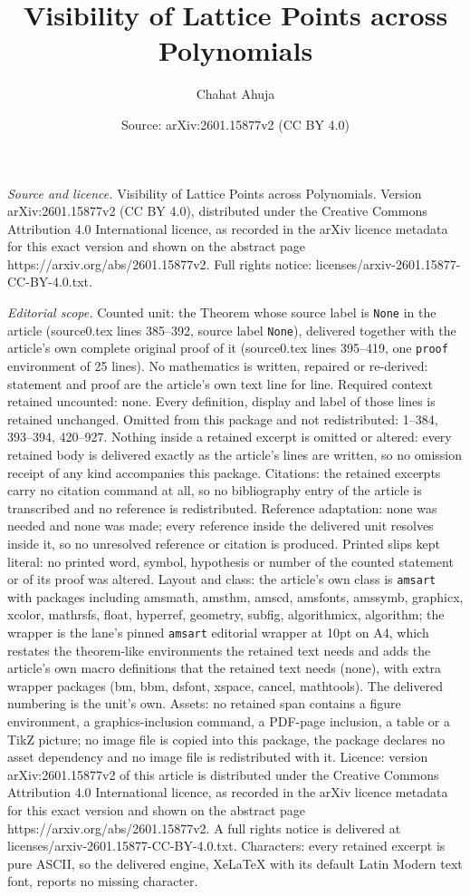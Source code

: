 \documentclass[10pt,a4paper]{amsart}
\title[Visibility of Lattice Points across Polynomials]{Visibility of Lattice Points across Polynomials}
\author{Chahat Ahuja}
\date{Source: arXiv:2601.15877v2 (CC BY 4.0)}
\begin{document}
\maketitle

\noindent\emph{Source and licence.} Visibility of Lattice Points across Polynomials. Version arXiv:2601.15877v2 (CC BY 4.0), distributed under the Creative Commons Attribution 4.0 International licence, as recorded in the arXiv licence metadata for this exact version and shown on the abstract page https://arxiv.org/abs/2601.15877v2. Full rights notice: licenses/arxiv-2601.15877-CC-BY-4.0.txt.\par\smallskip

\noindent\textit{Editorial scope.} Counted unit: the Theorem whose source label is \texttt{None} in the article (source0.tex lines 385--392, source label \texttt{None}), delivered together with the article's own complete original proof of it (source0.tex lines 395--419, one \texttt{proof} environment of 25 lines). No mathematics is written, repaired or re-derived: statement and proof are the article's own text line for line. Required context retained uncounted: none. Every definition, display and label of those lines is retained unchanged. Omitted from this package and not redistributed: 1--384, 393--394, 420--927. Nothing inside a retained excerpt is omitted or altered: every retained body is delivered exactly as the article's lines are written, so no omission receipt of any kind accompanies this package. Citations: the retained excerpts carry no citation command at all, so no bibliography entry of the article is transcribed and no reference is redistributed. Reference adaptation: none was needed and none was made; every reference inside the delivered unit resolves inside it, so no unresolved reference or citation is produced. Printed slips kept literal: no printed word, symbol, hypothesis or number of the counted statement or of its proof was altered. Layout and class: the article's own class is \texttt{amsart} with packages including amsmath, amsthm, amscd, amsfonts, amssymb, graphicx, xcolor, mathrsfs, float, hyperref, geometry, subfig, algorithmicx, algorithm; the wrapper is the lane's pinned \texttt{amsart} editorial wrapper at 10pt on A4, which restates the theorem-like environments the retained text needs and adds the article's own macro definitions that the retained text needs (none), with extra wrapper packages (bm, bbm, dsfont, xspace, cancel, mathtools). The delivered numbering is the unit's own. Assets: no retained span contains a figure environment, a graphics-inclusion command, a PDF-page inclusion, a table or a TikZ picture; no image file is copied into this package, the package declares no asset dependency and no image file is redistributed with it. Licence: version arXiv:2601.15877v2 of this article is distributed under the Creative Commons Attribution 4.0 International licence, as recorded in the arXiv licence metadata for this exact version and shown on the abstract page https://arxiv.org/abs/2601.15877v2. A full rights notice is delivered at licenses/arxiv-2601.15877-CC-BY-4.0.txt. Characters: every retained excerpt is pure ASCII, so the delivered engine, XeLaTeX with its default Latin Modern text font, reports no missing character.
\end{document}
